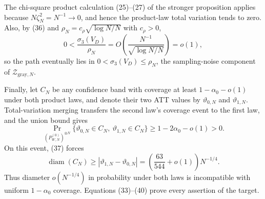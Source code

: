 The chi-square product calculation (25)--(27) of the stronger proposition applies because \(N\zeta_N^2=N^{-1}\to0\), and hence the product-law total variation tends to zero. Also, by (36) and \(\rho_N=c_{\rho}\sqrt{\log N/N}\) with \(c_{\rho}>0\),
\[
 0<\frac{\sigma_3(V_D)}{\rho_N}
 =O\!\left(\frac{N^{-1}}{\sqrt{\log N/N}}\right)=o(1),      \tag{38}
\]
so the path eventually lies in \(0<\sigma_3(V_D)\le\rho_N\), the sampling-noise component of \(\mathcal Z_{\mathrm{gray},N}\).

Finally, let \(C_N\) be any confidence band with coverage at least \(1-\alpha_0-o(1)\) under both product laws, and denote their two ATT values by \(\vartheta_{0,N}\) and \(\vartheta_{1,N}\). Total-variation merging transfers the second law's coverage event to the first law, and the union bound gives
\[
 \Pr_{(P_{W,N}^{(0)})^{\otimes N}}\{\vartheta_{0,N}\in C_N,\ \vartheta_{1,N}\in C_N\}
 \ge1-2\alpha_0-o(1)>0.                                      \tag{39}
\]
On this event, (37) forces
\[
 \operatorname{diam}(C_N)\ge|\vartheta_{1,N}-\vartheta_{0,N}|
 =\left(\frac{63}{544}+o(1)\right)N^{-1/4}.                 \tag{40}
\]
Thus diameter \(o(N^{-1/4})\) in probability under both laws is incompatible with uniform \(1-\alpha_0\) coverage. Equations (33)--(40) prove every assertion of the target.
